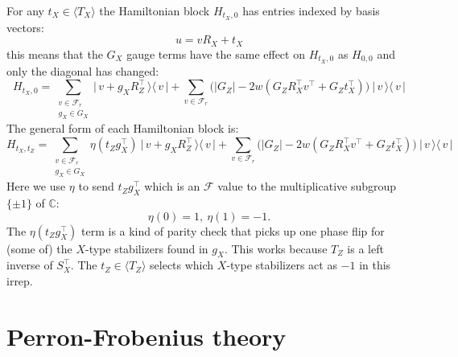 \documentclass[11pt,oneside]{article}
\newcommand{\todo}[1]{\ \textcolor{red}{\{#1\}}\ }
\def\Complex{\mathbb{C}}
\newcommand{\bket}[1]{\bigl|\,{#1}\,\bigr\rangle}
\newcommand{\bbra}[1]{\bigl\langle\,{#1}\,\bigr|}
\def\Span#1{\langle #1 \rangle}
\newcommand{\Field}{\mathcal{F}}
\def\Frd{\Field_{r}}
\begin{document}
For any $t_X\in \Span{T_X}$ the Hamiltonian block $H_{t_X,0}$
has entries indexed by basis vectors:
$$
    u = v R_X + t_X
$$
this means that the $G_X$ gauge terms
have the same effect on $H_{t_X,0}$
as $H_{0,0}$ and only the diagonal has changed:
\begin{equation}\label{hamblocktx}
H_{t_X,0} = \sum_{\substack{v\in\Frd\\g_X\in G_X } }
  \bket{v+g_X  R_Z^\top}\bbra{v} 
  + \sum_{v\in\Frd} \bigl(
    |G_Z| - 2w(G_Z R_X^\top v^\top + G_Z t_X^\top)
    \bigr) \ \bket{v}\bbra{v}
\end{equation}
The general form of
each Hamiltonian block is:
\begin{equation}\label{hamblockgen}
H_{t_X,t_Z} = \sum_{\substack{v\in\Frd\\g_X\in G_X } }
    \eta(t_Z g_X^\top)
  \ \bket{v+g_X  R_Z^\top}\bbra{v} 
  + \sum_{v\in\Frd} \bigl(
    |G_Z| - 2w(G_Z R_X^\top v^\top + G_Z t_X^\top)
    \bigr) \ \bket{v}\bbra{v}
\end{equation}
Here we use $\eta$ to send 
$t_Zg_X^\top$ which is an $\Field$ value
to the multiplicative subgroup $\{\pm1\}$
of $\Complex:$
$$
    \eta(0) = 1,\ \eta(1) = -1.
$$
The $\eta(t_Zg_X^\top)$ term
is a kind of parity check that
picks up one phase flip for (some of)
the $X$-type stabilizers found in $g_X.$
This works because $T_Z$ is a left inverse
of $S_X^\top.$
The $t_Z\in\Span{T_Z}$ selects which
$X$-type stabilizers act as $-1$ in this irrep.



%

\section{Perron-Frobenius theory}\label{Sec5}
\end{document}
